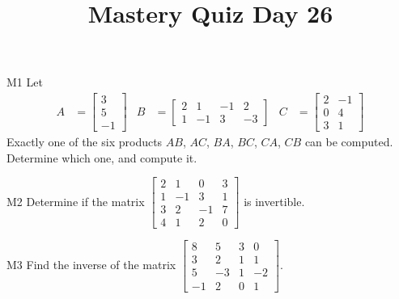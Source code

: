 \documentclass{sbgLAquiz}
\title{Mastery Quiz Day 26 }
\begin{document}
\begin{problem}{M1}
Let
\begin{align*}
A &= \begin{bmatrix} 3 \\ 5 \\ -1  \end{bmatrix} & B&=\begin{bmatrix}  2 & 1 & -1 & 2 \\ 1 & -1 & 3 & -3  \end{bmatrix} & C &= \begin{bmatrix} 2 & -1 \\ 0 & 4 \\ 3 & 1 \end{bmatrix} \end{align*}
Exactly one of the six products $AB$, $AC$, $BA$, $BC$, $CA$, $CB$ can be computed.  Determine which one, and compute it.
\end{problem}

\begin{problem}{M2}
Determine if the matrix $\begin{bmatrix} 2 & 1 & 0 & 3 \\ 1 & -1 & 3 & 1 \\ 3 & 2 & -1 & 7 \\ 4 & 1 & 2 & 0 \end{bmatrix}$ is invertible.
\end{problem}
\newpage

\begin{problem}{M3}
Find the inverse of the matrix $\begin{bmatrix} 8 & 5 & 3 & 0 \\ 3 & 2 & 1 & 1 \\ 5 & -3 & 1 & -2 \\ -1 & 2 & 0 & 1\end{bmatrix} $.
\end{problem}
\end{document}
